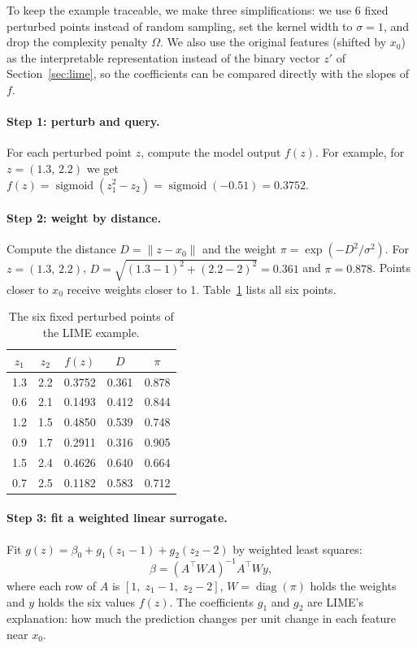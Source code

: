 \documentclass[11pt,a4paper]{article}
\begin{document}
To keep the example traceable, we make three simplifications: we use 6 fixed
perturbed points instead of random sampling, set the kernel width to
$\sigma = 1$, and drop the complexity penalty $\Omega$. We also use the
original features (shifted by $x_0$) as the interpretable representation
instead of the binary vector $z'$ of Section~\ref{sec:lime}, so the coefficients can be
compared directly with the slopes of $f$.

\paragraph{Step 1: perturb and query.} For each perturbed point $z$, compute
the model output $f(z)$. For example, for $z = (1.3,\, 2.2)$ we get
$f(z) = \operatorname{sigmoid}(z_1^2 - z_2) =  \operatorname{sigmoid}(-0.51) = 0.3752$.

\paragraph{Step 2: weight by distance.} Compute the distance
$D = \lVert z - x_0 \rVert$ and the weight $\pi = \exp(-D^2/\sigma^2)$. For
$z = (1.3,\, 2.2)$, $D = \sqrt{(1.3 - 1)^2 +(2.2 - 2)^2} = 0.361$ and $\pi = 0.878$.
Points closer to $x_0$ receive weights closer to 1. Table~\ref{tab:limepoints}
lists all six points.

\begin{table}[!htb]
\centering\small
\caption{The six fixed perturbed points of the LIME example.}\label{tab:limepoints}
\begin{tabular}{ccccc}
\toprule
$z_1$ & $z_2$ & $f(z)$ & $D$ & $\pi$\\
\midrule
1.3 & 2.2 & 0.3752 & 0.361 & 0.878\\
0.6 & 2.1 & 0.1493 & 0.412 & 0.844\\
1.2 & 1.5 & 0.4850 & 0.539 & 0.748\\
0.9 & 1.7 & 0.2911 & 0.316 & 0.905\\
1.5 & 2.4 & 0.4626 & 0.640 & 0.664\\
0.7 & 2.5 & 0.1182 & 0.583 & 0.712\\
\bottomrule
\end{tabular}
\end{table}

\paragraph{Step 3: fit a weighted linear surrogate.} Fit
$g(z) = \beta_0 + g_1 (z_1 - 1) + g_2 (z_2 - 2)$ by weighted least squares:
\begin{equation}
\beta = (A^\top W A)^{-1} A^\top W y,
\end{equation}
where each row of $A$ is $[1,\; z_1 - 1,\; z_2 - 2]$, $W = \operatorname{diag}(\pi)$
holds the weights and $y$ holds the six values $f(z)$. The coefficients $g_1$
and $g_2$ are LIME's explanation: how much the prediction changes per unit
change in each feature near $x_0$.
\end{document}
